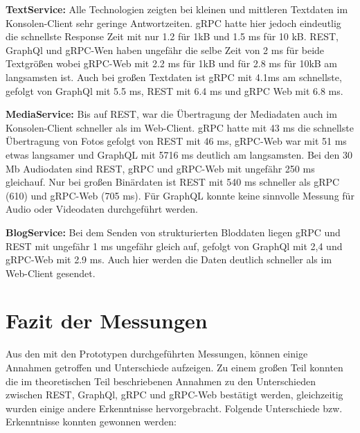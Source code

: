 \clearpage
\textbf{TextService:}  
Alle Technologien zeigten bei kleinen und mittleren Textdaten im Konsolen-Client sehr geringe Antwortzeiten. gRPC hatte hier jedoch eindeutlig die schnellste Response Zeit mit nur 1.2 für 1kB und 1.5 ms für 10 kB. REST, GraphQl und gRPC-Wen haben ungefähr die selbe Zeit von 2 ms für beide Textgrößen wobei gRPC-Web mit 2.2 ms für 1kB und für  2.8 ms für 10kB am langsamsten ist.
Auch bei großen Textdaten ist gRPC mit 4.1ms am schnellste, gefolgt von GraphQl mit 5.5 ms, REST mit 6.4 ms und gRPC Web mit 6.8 ms.


\textbf{MediaService:}  
Bis auf REST, war die Übertragung der Mediadaten auch im Konsolen-Client schneller als im Web-Client. gRPC hatte mit 43 ms die schnellste Übertragung von Fotos gefolgt von REST mit 46 ms, gRPC-Web war mit 51 ms etwas langsamer und GraphQL mit 5716 ms deutlich am langsamsten. Bei den 30 Mb Audiodaten sind REST, gRPC und gRPC-Web mit ungefähr 250 ms gleichauf. Nur bei großen Binärdaten ist REST mit 540 ms schneller als gRPC (610) und gRPC-Web (705 ms). Für GraphQL konnte keine sinnvolle Messung für Audio oder Videodaten durchgeführt werden.

\textbf{BlogService:}  
Bei dem Senden von strukturierten Bloddaten liegen gRPC und REST mit ungefähr 1 ms ungefähr gleich auf, gefolgt von GraphQl mit 2,4 und gRPC-Web mit 2.9 ms. Auch hier werden die Daten deutlich schneller als im Web-Client gesendet.

\clearpage
\section*{Fazit der Messungen}
Aus den mit den Prototypen durchgeführten Messungen, können einige Annahmen getroffen und Unterschiede aufzeigen. Zu einem großen Teil konnten die im theoretischen Teil beschriebenen Annahmen zu den Unterschieden zwischen REST, GraphQl, gRPC und gRPC-Web bestätigt werden, gleichzeitig wurden einige andere Erkenntnisse hervorgebracht. Folgende Unterschiede bzw. Erkenntnisse konnten gewonnen werden:

\chapterend